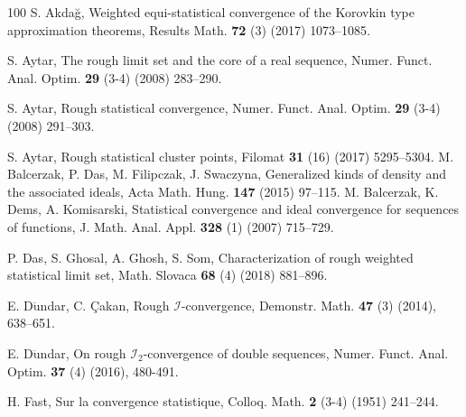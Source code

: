 \documentclass[reqno]{amsart}
\begin{document}
{\begin{thebibliography}{100}
		 S. Akda{\u{g}}, Weighted equi-statistical convergence of the Korovkin type approximation theorems, Results Math. \textbf{72} (3) (2017) {1073--1085}.
		
		
		
	
	 S. Aytar, The rough limit set and the core of a real sequence,  Numer. Funct. Anal. Optim. {\textbf{29}} (3-4) (2008) {283--290}.
	
	 S. Aytar, Rough statistical convergence, Numer. Funct. Anal. Optim. {\textbf{29}} (3-4) (2008) {291--303}.
	
	  S. Aytar, Rough statistical cluster points, Filomat {\textbf{31}} (16) (2017) {5295--5304}. 
	 M. Balcerzak, P. Das, M. Filipczak, J. Swaczyna, Generalized kinds of density and the associated ideals, Acta Math. Hung. {\bf 147} (2015) {97--115}. 	
	 M. Balcerzak, K. Dems, A. Komisarski, Statistical convergence and ideal convergence for sequences of functions, J. Math. Anal. Appl. {\bf 328} (1) (2007) {715--729}. 
	
	
	
	
	
	 P. Das, S. Ghosal, A. Ghosh, S. Som, Characterization of rough weighted statistical limit set, Math. Slovaca {\textbf{68}} (4) (2018) 881--896.
	
	 E. D$\ddot{\mbox{u}}$ndar, C. {\c{C}}akan, Rough $\mathcal{I}$-convergence, Demonstr. Math. \textbf{47} (3) (2014), {638--651}.
	
	  E. D$\ddot{\mbox{u}}$ndar,  On rough $\mathcal{I}_2$-convergence of double sequences, Numer. Funct. Anal. Optim. \textbf{37} (4) (2016), 480-491.
	
		 H. Fast, Sur la convergence statistique, Colloq. Math. {\textbf{2}} (3-4) (1951) {241--244}.
	

\end{thebibliography}}
\end{document}
